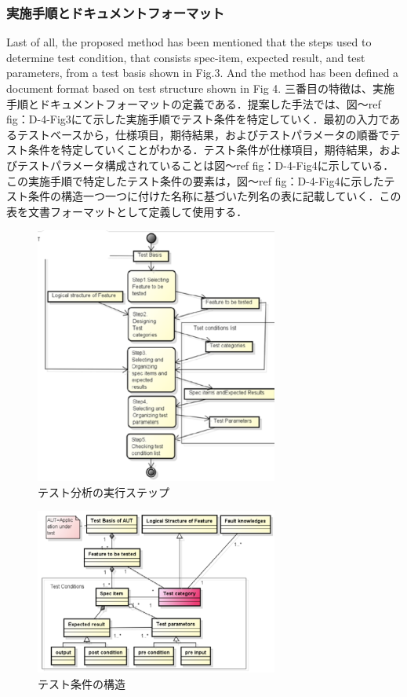\documentclass[a4paper,12pt]{jreport}
\begin{document}
\subsubsection{実施手順とドキュメントフォーマット}
Last of all,   the proposed method has been mentioned that the steps used to determine test condition, that consists spec-item, expected result, and test parameters, from a test basis shown in Fig.3. And the method has been defined a document format based on test structure shown in Fig 4.
三番目の特徴は、実施手順とドキュメントフォーマットの定義である．提案した手法では、図〜ref {fig：D-4-Fig3}にて示した実施手順でテスト条件を特定していく．最初の入力であるテストベースから，仕様項目，期待結果，およびテストパラメータの順番でテスト条件を特定していくことがわかる．テスト条件が仕様項目，期待結果，およびテストパラメータ構成されていることは図〜ref {fig：D-4-Fig4}に示している．この実施手順で特定したテスト条件の要素は，図〜ref {fig：D-4-Fig4}に示したテスト条件の構造一つ一つに付けた名称に基づいた列名の表に記載していく．この表を文書フォーマットとして定義して使用する．
\begin{figure}[htbp]
  \begin{center}
  \includegraphics[width=8cm]{./image/D-4-Fig3.png}
  \caption{テスト分析の実行ステップ}
  \label{fig:D-4-Fig3}
  \end{center}
   \end{figure}

\begin{figure}[htbp]
  \begin{center}
  \includegraphics[width=8cm]{./image/D-4-Fig4.png}
  \caption{テスト条件の構造}
  \label{fig:D-4-Fig4}
  \end{center}
   \end{figure}
\end{document}
